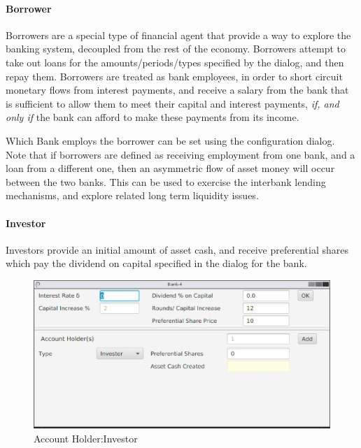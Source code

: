 \documentclass[10pt,oneside,openright, a4paper]{memoir}
\begin{document}
\paragraph{Borrower}
Borrowers are a special type of financial agent that provide a way to 
explore the banking system, decoupled from the rest of the economy. 
Borrowers attempt to take out loans for the amounts/periods/types specified
by the dialog, and then repay them. Borrowers are treated as bank employees,
in order to short circuit monetary flows from interest payments, and 
receive a salary from the bank that is sufficient to allow them to
meet their capital and interest payments, \emph{if, and only if} the bank
can afford to make these payments from its income.
\par
Which Bank employs the borrower can be set using the configuration 
dialog. Note that if borrowers are defined as receiving employment
from one bank, and a loan from a different one, then an asymmetric
flow of asset money will occur between the two banks. This can be
used to exercise the interbank lending mechanisms, and explore
related long term liquidity issues. 

\paragraph{Investor}
Investors provide an initial amount of asset cash, and receive
preferential shares which pay the dividend on capital specified
in the dialog for the bank. 
\begin{figure}[h]
\begin{center}
\includegraphics[width=14cm]{images/fig_investor.eps}
\caption{Account Holder:Investor}
\label{fig:investor}
\end{center}
\end{figure}
\end{document}
